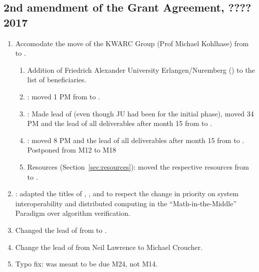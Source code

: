 \subsection*{2nd amendment of the Grant Agreement, ???? 2017}
\begin{enumerate}
\item Accomodate the move of the KWARC Group (Prof Michael Kohlhase) from  to
  . 
\begin{enumerate}
\item Addition of Friedrich Alexander University Erlangen/Nuremberg () to the
  list of beneficiaries.
\item {}: moved 1 PM from  to .
\item {}: Made  lead of  (even though JU had been
  for the initial phase), moved 34 PM and the lead of all deliverables after month 15 from
   to .
\item {}: moved 8 PM and the lead of all deliverables after month 15 from
   to . Postponed  from M12 to M18
\item Resources (Section~\ref{sec:resources}): moved the respective resources from
   to .
\end{enumerate}
\item {}: adapted the titles of ,
  , and  to respect the change in
  priority on system interoperability and distributed computing in the
  ``Math-in-the-Middle'' Paradigm over algorithm verification. 
\item Changed the lead of 
  from  to .
\item Change the lead of  from Neil Lawrence to Michael Croucher.
\item Typo fix:  was meant to be due M24, not M14.
\end{enumerate}
\clearpage
\setcounter{page}{1}


